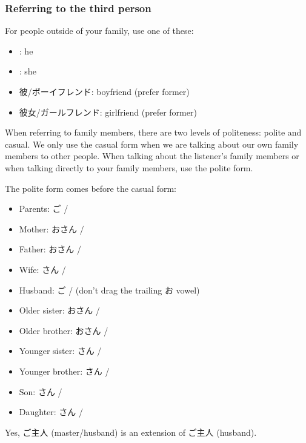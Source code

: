 \documentclass[../nihongo-gakushuu-kyouzai.tex]{subfiles}
\begin{document}
\subsubsection{Referring to the third person}
For people outside of your family, use one of these:
\begin{itemize}
    \item {}: he
    \item {}: she
    \item 彼/ボーイフレンド: boyfriend (prefer former)
    \item 彼女/ガールフレンド: girlfriend (prefer former)
\end{itemize}

When referring to family members, there are two levels of politeness: polite and casual. We only use the casual form when we are talking about our own family members to other people. When talking about the listener's family members or when talking directly to your family members, use the polite form.

The polite form comes before the casual form:
\begin{itemize}
    \item Parents: ご / 
    \item Mother: おさん / 
    \item Father: おさん / 
    \item Wife: さん / 
    \item Husband: ご /  (don't drag the trailing お vowel)
    \item Older sister: おさん / 
    \item Older brother: おさん / 
    \item Younger sister: さん / 
    \item Younger brother: さん / 
    \item Son: さん / 
    \item Daughter: さん / 
\end{itemize}
Yes, ご主人 (master/husband) is an extension of ご主人 (husband).
\end{document}

